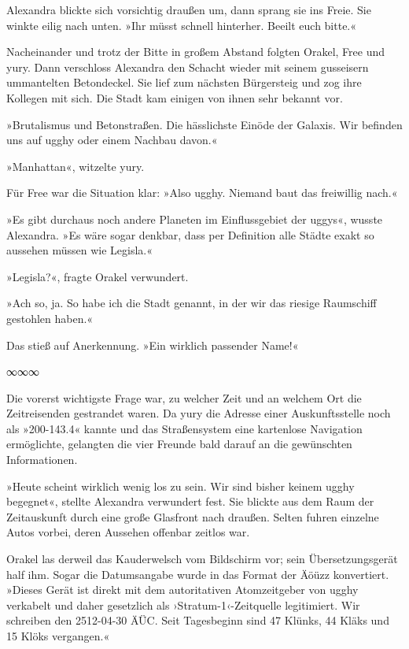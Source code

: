 Alexandra blickte sich vorsichtig draußen um, dann sprang sie ins Freie. Sie winkte eilig nach unten. »Ihr müsst schnell hinterher. Beeilt euch bitte.«

Nacheinander und trotz der Bitte in großem Abstand folgten Orakel, Free und yury. Dann verschloss Alexandra den Schacht wieder mit seinem gusseisern ummantelten Betondeckel. Sie lief zum nächsten Bürgersteig und zog ihre Kollegen mit sich. Die Stadt kam einigen von ihnen sehr bekannt vor.

»Brutalismus und Betonstraßen. Die hässlichste Einöde der Galaxis. Wir befinden uns auf ugghy oder einem Nachbau davon.«

»Manhattan«, witzelte yury.

Für Free war die Situation klar: »Also ugghy. Niemand baut das freiwillig nach.«

»Es gibt durchaus noch andere Planeten im Einflussgebiet der uggys«, wusste Alexandra. »Es wäre sogar denkbar, dass per Definition alle Städte exakt so aussehen müssen wie Legisla.«

»Legisla?«, fragte Orakel verwundert.

»Ach so, ja. So habe ich die Stadt genannt, in der wir das riesige Raumschiff gestohlen haben.«

Das stieß auf Anerkennung. »Ein wirklich passender Name!«

\begin{center}
∞∞∞
\end{center}

Die vorerst wichtigste Frage war, zu welcher Zeit und an welchem Ort die Zeitreisenden gestrandet waren. Da yury die Adresse einer Auskunftsstelle noch als »200-143.4« kannte und das Straßensystem eine kartenlose Navigation ermöglichte, gelangten die vier Freunde bald darauf an die gewünschten Informationen.

»Heute scheint wirklich wenig los zu sein. Wir sind bisher keinem ugghy begegnet«, stellte Alexandra verwundert fest. Sie blickte aus dem Raum der Zeitauskunft durch eine große Glasfront nach draußen. Selten fuhren einzelne Autos vorbei, deren Aussehen offenbar zeitlos war.

Orakel las derweil das Kauderwelsch vom Bildschirm vor; sein Übersetzungsgerät half ihm. Sogar die Datumsangabe wurde in das Format der Äöüzz konvertiert. »Dieses Gerät ist direkt mit dem autoritativen Atomzeitgeber von ugghy verkabelt und daher gesetzlich als ›Stratum-1‹-Zeitquelle legitimiert. Wir schreiben den 2512-04-30 ÄÜC. Seit Tagesbeginn sind 47 Klünks, 44 Kläks und 15 Klöks vergangen.«

